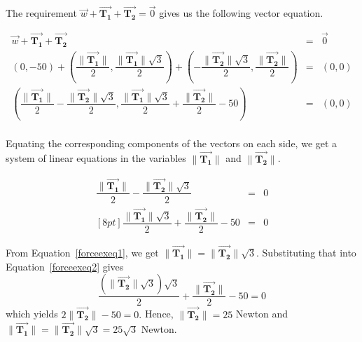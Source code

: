 \begin{example}
The requirement $\vec{w} + \overrightarrow{\mathbf{T_1}} + \overrightarrow{\mathbf{T_2}} = \vec{0}$ gives us the following  vector equation.
 
 \[ \begin{array}{rcl}
 
\vec{w} + \overrightarrow{\mathbf{T_1}} + \overrightarrow{\mathbf{T_2}} &  = &  \vec{0}  \\ [8pt]

\left(0,-50\right) + \left( \dfrac{\| \overrightarrow{\mathbf{T_1}}  \|}{2} , \dfrac{\| \overrightarrow{\mathbf{T_1}}  \|\sqrt{3}}{2}\right) +  \left(-\dfrac{\| \overrightarrow{\mathbf{T_2}} \|\sqrt{3}}{2}, \dfrac{\| \overrightarrow{\mathbf{T_2}} \|}{2} \right) & = & \left(0, 0\right) \\ [8pt]

\left( \dfrac{\| \overrightarrow{\mathbf{T_1}}  \|}{2} -\dfrac{\| \overrightarrow{\mathbf{T_2}} \|\sqrt{3}}{2}, \dfrac{\| \overrightarrow{\mathbf{T_1}}  \|\sqrt{3}}{2} +  \dfrac{\| \overrightarrow{\mathbf{T_2}} \|}{2} -50  \right) & = & \left(0, 0\right)  \\ 
\end{array} \]

Equating the corresponding components of the vectors on each side,  we get a system of linear equations in the variables $\| \overrightarrow{\mathbf{T_1}} \| $ and   $\| \overrightarrow{\mathbf{T_2}} \|$.


\begin{eqnarray}
  \dfrac{\| \overrightarrow{\mathbf{T_1}}  \|}{2} -\dfrac{\| \overrightarrow{\mathbf{T_2}} \|\sqrt{3}}{2} & = & 0 \label{forceexeq1}\\ [8pt]  
	 \dfrac{\| \overrightarrow{\mathbf{T_1}}  \|\sqrt{3}}{2} +  \dfrac{\| \overrightarrow{\mathbf{T_2}}  \|}{2} -50 & = & 0 \label{forceexeq2}
	\end{eqnarray}

From Equation~\eqref{forceexeq1}, we get $\| \overrightarrow{\mathbf{T_1}}  \| = \| \overrightarrow{\mathbf{T_2}} \| \sqrt{3}$.  Substituting that into Equation~\eqref{forceexeq2} gives 
$$\frac{(\| \overrightarrow{\mathbf{T_2}}  \| \sqrt{3})\sqrt{3}}{2} +  \frac{\| \overrightarrow{\mathbf{T_2}}  \|}{2} - 50 = 0$$
which yields $2\| \overrightarrow{\mathbf{T_2}} \| - 50 =0.$
Hence, $\| \overrightarrow{\mathbf{T_2}} \| = 25$ Newton and  $\| \overrightarrow{\mathbf{T_1}} \| = \| \overrightarrow{\mathbf{T_2}}  \| \sqrt{3} = 25 \sqrt{3}$ Newton.

\end{example}


